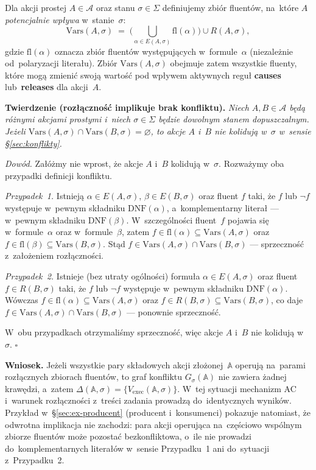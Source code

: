 \documentclass[11pt,a4paper]{article}
\newcommand{\causes}{\textbf{causes}}
\newcommand{\releases}{\textbf{releases}}
\newcommand{\DNF}{\mathrm{DNF}}
\theoremstyle{definition}
\begin{document}
\medskip
\noindent Dla akcji prostej $A \in \mathcal{A}$ oraz stanu $\sigma \in \Sigma$
definiujemy zbiór fluentów, na~które $A$ \emph{potencjalnie wpływa}
w~stanie~$\sigma$:
\[
  \mathrm{Vars}(A,\sigma)
    \;=\; \Big(\bigcup_{\alpha \in E(A,\sigma)} \mathrm{fl}(\alpha)\Big)
    \cup R(A,\sigma),
\]
gdzie $\mathrm{fl}(\alpha)$ oznacza zbiór fluentów występujących
w~formule~$\alpha$ (niezależnie od~polaryzacji literału). Zbiór
$\mathrm{Vars}(A,\sigma)$ obejmuje zatem wszystkie fluenty, które mogą
zmienić swoją wartość pod wpływem aktywnych reguł \causes{} lub~\releases{}
dla akcji~$A$.

\medskip
\noindent \textbf{Twierdzenie (rozłączność implikuje brak konfliktu).}
\emph{Niech $A, B \in \mathcal{A}$ będą różnymi akcjami prostymi
i~niech $\sigma \in \Sigma$ będzie dowolnym stanem dopuszczalnym.
Jeżeli $\mathrm{Vars}(A,\sigma) \cap \mathrm{Vars}(B,\sigma) = \varnothing$,
to akcje $A$ i~$B$ nie kolidują w~$\sigma$ w~sensie
\S\ref{sec:konflikty}.}

\medskip
\noindent \textit{Dowód.}
Załóżmy nie wprost, że akcje $A$ i~$B$ kolidują w~$\sigma$. Rozważymy
oba przypadki definicji konfliktu.

\emph{Przypadek~1.} Istnieją $\alpha \in E(A,\sigma)$, $\beta \in E(B,\sigma)$
oraz fluent $f$ taki, że $f$ lub $\neg f$ występuje w~pewnym składniku
$\DNF(\alpha)$, a~komplementarny literał --- w~pewnym składniku
$\DNF(\beta)$. W~szczególności fluent~$f$ pojawia się w~formule~$\alpha$
oraz w~formule~$\beta$, zatem $f \in \mathrm{fl}(\alpha) \subseteq
\mathrm{Vars}(A,\sigma)$ oraz $f \in \mathrm{fl}(\beta) \subseteq
\mathrm{Vars}(B,\sigma)$. Stąd $f \in \mathrm{Vars}(A,\sigma) \cap
\mathrm{Vars}(B,\sigma)$ --- sprzeczność z~założeniem rozłączności.

\emph{Przypadek~2.} Istnieje (bez utraty ogólności) formuła
$\alpha \in E(A,\sigma)$ oraz fluent $f \in R(B,\sigma)$ taki, że
$f$ lub $\neg f$ występuje w~pewnym składniku $\DNF(\alpha)$.
Wówczas $f \in \mathrm{fl}(\alpha) \subseteq \mathrm{Vars}(A,\sigma)$
oraz $f \in R(B,\sigma) \subseteq \mathrm{Vars}(B,\sigma)$, co daje
$f \in \mathrm{Vars}(A,\sigma) \cap \mathrm{Vars}(B,\sigma)$ ---
ponownie sprzeczność.

\noindent W~obu przypadkach otrzymaliśmy sprzeczność, więc akcje $A$
i~$B$ nie kolidują w~$\sigma$. \hfill$\square$

\medskip
\noindent \textbf{Wniosek.}
Jeżeli wszystkie pary składowych akcji złożonej~$\mathbb{A}$ operują
na~parami rozłącznych zbiorach fluentów, to graf konfliktu
$G_\sigma(\mathbb{A})$ nie zawiera żadnej krawędzi, a~zatem
$\Delta(\mathbb{A},\sigma) = \{V_{\mathrm{exec}}(\mathbb{A},\sigma)\}$.
W~tej sytuacji mechanizm AC i~warunek rozłączności z~treści zadania
prowadzą do~identycznych wyników. Przykład w~§\ref{sec:ex-producent} (producent i~konsumenci)
pokazuje natomiast, że odwrotna implikacja nie zachodzi: para akcji
operująca na~częściowo wspólnym zbiorze fluentów może pozostać
bezkonfliktowa, o~ile nie prowadzi do~komplementarnych literałów
w~sensie Przypadku~1 ani do~sytuacji z~Przypadku~2.
\end{document}

